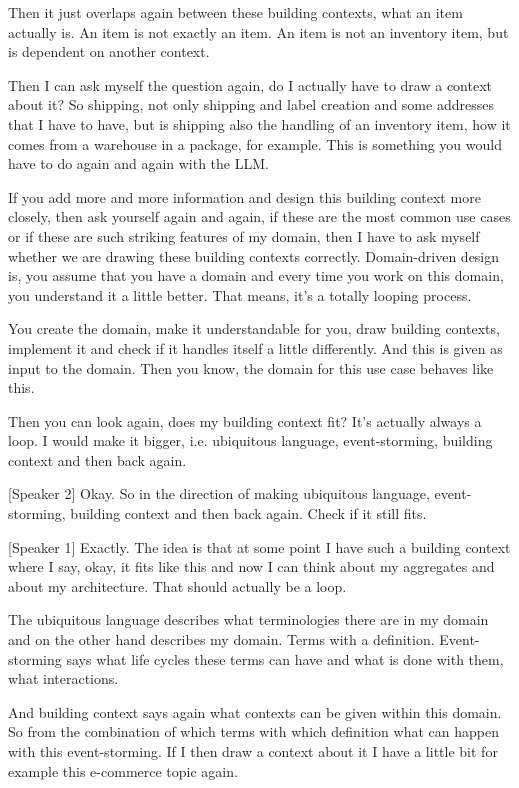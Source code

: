 Then it just overlaps again between these building contexts, what an item actually is. An item is not exactly an item. An item is not an inventory item, but is dependent on another context.

Then I can ask myself the question again, do I actually have to draw a context about it? So shipping, not only shipping and label creation and some addresses that I have to have, but is shipping also the handling of an inventory item, how it comes from a warehouse in a package, for example. This is something you would have to do again and again with the LLM.

If you add more and more information and design this building context more closely, then ask yourself again and again, if these are the most common use cases or if these are such striking features of my domain, then I have to ask myself whether we are drawing these building contexts correctly. Domain-driven design is, you assume that you have a domain and every time you work on this domain, you understand it a little better. That means, it's a totally looping process.

You create the domain, make it understandable for you, draw building contexts, implement it and check if it handles itself a little differently. And this is given as input to the domain. Then you know, the domain for this use case behaves like this.

Then you can look again, does my building context fit? It's actually always a loop. I would make it bigger, i.e. ubiquitous language, event-storming, building context and then back again.

[Speaker 2]
Okay. So in the direction of making ubiquitous language, event-storming, building context and then back again. Check if it still fits.

[Speaker 1]
Exactly. The idea is that at some point I have such a building context where I say, okay, it fits like this and now I can think about my aggregates and about my architecture. That should actually be a loop.

The ubiquitous language describes what terminologies there are in my domain and on the other hand describes my domain. Terms with a definition. Event-storming says what life cycles these terms can have and what is done with them, what interactions.

And building context says again what contexts can be given within this domain. So from the combination of which terms with which definition what can happen with this event-storming. If I then draw a context about it I have a little bit for example this e-commerce topic again.

